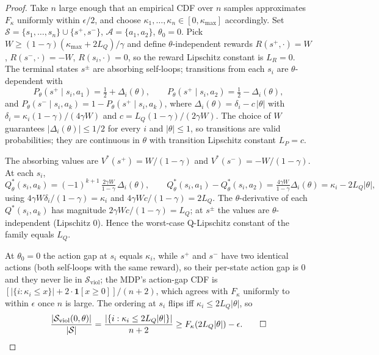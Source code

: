 \documentclass{article}
\newcommand{\cS}{\mathcal{S}}
\newcommand{\cA}{\mathcal{A}}
\newcommand{\Sviol}{\mathcal{S}_{\mathrm{viol}}}
\begin{document}
\begin{proof}
Take $n$ large enough that an empirical CDF over $n$ samples approximates $F_\kappa$ uniformly within $\epsilon/2$, and choose $\kappa_1, \ldots, \kappa_n \in [0, \kappa_{\max}]$ accordingly. Set $\cS = \{s_1, \ldots, s_n\} \cup \{s^+, s^-\}$, $\cA = \{a_1, a_2\}$, $\theta_0 = 0$. Pick $W \geq (1-\gamma)(\kappa_{\max} + 2L_Q)/\gamma$ and define $\theta$-independent rewards $R(s^+, \cdot) = W$, $R(s^-, \cdot) = -W$, $R(s_i, \cdot) = 0$, so the reward Lipschitz constant is $L_R = 0$. The terminal states $s^\pm$ are absorbing self-loops; transitions from each $s_i$ are $\theta$-dependent with
\[
P_\theta(s^+ \mid s_i, a_1) = \tfrac{1}{2} + \Delta_i(\theta), \qquad P_\theta(s^+ \mid s_i, a_2) = \tfrac{1}{2} - \Delta_i(\theta),
\]
and $P_\theta(s^- \mid s_i, a_k) = 1 - P_\theta(s^+ \mid s_i, a_k)$, where $\Delta_i(\theta) = \delta_i - c\,|\theta|$ with $\delta_i = \kappa_i(1-\gamma)/(4\gamma W)$ and $c = L_Q(1-\gamma)/(2\gamma W)$. The choice of $W$ guarantees $|\Delta_i(\theta)| \leq 1/2$ for every $i$ and $|\theta| \leq 1$, so transitions are valid probabilities; they are continuous in $\theta$ with transition Lipschitz constant $L_P = c$.

The absorbing values are $V^*(s^+) = W/(1-\gamma)$ and $V^*(s^-) = -W/(1-\gamma)$. At each $s_i$,
\[
Q^*_\theta(s_i, a_k) = (-1)^{k+1}\, \tfrac{2\gamma W}{1-\gamma}\,\Delta_i(\theta),
\qquad
Q^*_\theta(s_i, a_1) - Q^*_\theta(s_i, a_2) = \tfrac{4\gamma W}{1-\gamma}\Delta_i(\theta) = \kappa_i - 2L_Q|\theta|,
\]
using $4\gamma W \delta_i/(1-\gamma) = \kappa_i$ and $4\gamma W c/(1-\gamma) = 2L_Q$. The $\theta$-derivative of each $Q^*(s_i, a_k)$ has magnitude $2\gamma W c/(1-\gamma) = L_Q$; at $s^\pm$ the values are $\theta$-independent (Lipschitz $0$). Hence the worst-case Q-Lipschitz constant of the family equals $L_Q$.

At $\theta_0 = 0$ the action gap at $s_i$ equals $\kappa_i$, while $s^+$ and $s^-$ have two identical actions (both self-loops with the same reward), so their per-state action gap is $0$ and they never lie in $\Sviol$; the MDP's action-gap CDF is $[|\{i : \kappa_i \leq x\}| + 2\cdot\mathbf{1}[x \geq 0]]/(n+2)$, which agrees with $F_\kappa$ uniformly to within $\epsilon$ once $n$ is large. The ordering at $s_i$ flips iff $\kappa_i \leq 2L_Q|\theta|$, so
\[
\frac{|\Sviol(0, \theta)|}{|\cS|} = \frac{|\{i : \kappa_i \leq 2L_Q|\theta|\}|}{n+2} \geq F_\kappa(2L_Q|\theta|) - \epsilon. \qed
\]
\end{proof}
\end{document}
